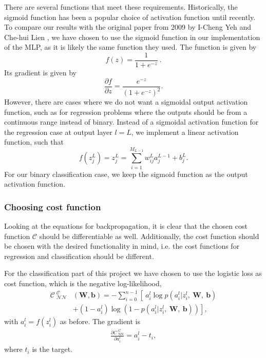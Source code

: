 \documentclass[a4paper, 11pt, twocolumn]{article}
\begin{document}
There are several functions that meet these requirements. Historically, the 
sigmoid function has been a popular choice of activation function until recently. 
To compare our results with the original paper from 2009 by I-Cheng Yeh and 
Che-hui Lien \cite{origarticle}, we have chosen to use the sigmoid function in 
our implementation of the MLP, as it is likely the same function they used. The 
function is given by 
\begin{equation}
	f(z) = \frac{1}{1+e^{-z}}\ .
\end{equation}
Its gradient is given by 
\begin{equation}
	\label{eq:df/dz}
	\frac{\partial f}{\partial z} = \frac{e^{-z}}{(1+e^{-z})^2}.
\end{equation}
However, there are cases where we do not want a sigmoidal output activation 
function, such as for regression problems where the outputs should be from a 
continuous range instead of binary. Instead of a sigmoidal activation function 
for the regression case at output layer $l=L$, we implement a linear activation 
function, such that 
\begin{equation}
f(z_j^L)=z_j^L= \sum_{i=1}^{M_{L-1}} w_{ij}^L a_j^{L-1} + b_j^L.
\end{equation}
For our binary classification case, we keep the sigmoid function as the output 
activation function.
\subsubsection{Choosing cost function}
Looking at the equations for backpropagation, it is clear that the chosen cost 
function $\mathcal{C}$ should be differentiable as well. 
Additionally, the cost function should be chosen with the desired functionality 
in mind, i.e. the cost functions for regression and classification should be different.

For the classification part of this project we have chosen to use the logistic 
loss as cost function, which is the negative log-likelihood,
\begin{align}
\mathcal{C_\text{ NN}^\text{ C}}&(\bm{W}, \bm{b}) = -\sum_{i=0}^{n-1} 
\left[\  a_i^l\log p\left(a_i^l|z_i^l,\ \bm{ W,\ b} \right) \right.  \\
&   \left. + (1-a_i^l)\log \left(1-p(a_i^l|z_i^l,\ \bm{ W,\ b} )\right) \right],  
\nonumber
\end{align}
with $a_i^l=f(z_i^l)$ as before. The gradient is 
\begin{align}
\frac{ \partial C_\text{ NN}^\text{ C}}  {\partial a_i^l} =
a_i^l-t_i,
\end{align}
where $t_i$ is the target.\\
\end{document}
